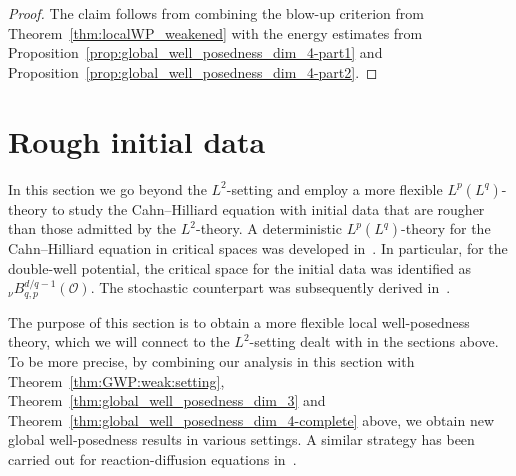 \documentclass[reqno]{amsart}
\newcommand{\sO}{\mathscr{O}}
\newcommand{\1}{\mathbf{1}}
\begin{document}
\begin{proof}
 The claim follows from combining the blow-up criterion from Theorem~\ref{thm:localWP_weakened} with the energy estimates from Proposition~\ref{prop:global_well_posedness_dim_4-part1} and Proposition~\ref{prop:global_well_posedness_dim_4-part2}.
\end{proof}




\renewcommand{\theenumi}{(\alph{enumi})}



\section{Rough initial data}\label{section_rough_initial_data}

In this section we go beyond the $L^2$-setting and employ a more flexible $L^p(L^q)$-theory to study the Cahn--Hilliard equation with  initial data that are rougher than those admitted by the $L^2$-theory. 
A deterministic $L^p(L^q)$-theory for the Cahn--Hilliard equation in critical spaces was developed in~\cite{prussCriticalSpacesQuasilinear2018}. In particular, for the double-well potential, the critical space for the initial data was identified as $_\nu B^{d/q-1}_{q,p}(\sO)$. The stochastic counterpart was subsequently derived in~\cite[Section 7.3]{agrestiNonlinearParabolicStochastic2022}.

The purpose of this section is to obtain a more flexible local well-posedness theory, which we will connect to the $L^2$-setting dealt with in the sections above. To be more precise, by combining our analysis in this section with Theorem~\ref{thm:GWP:weak:setting}, Theorem~\ref{thm:global_well_posedness_dim_3} and Theorem~\ref{thm:global_well_posedness_dim_4-complete} above, we obtain new global well-posedness results in various settings. A similar strategy has been carried out for reaction-diffusion equations in~\cite{agresti2023reactiondiffusion_local}. 
\end{document}
